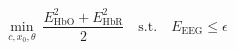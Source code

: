 \documentclass{article}
\begin{document}
\fontsize{22}{29}\selectfont
\[
\min_{c,x_0,\theta}\ \frac{E_{\mathrm{HbO}}^2+E_{\mathrm{HbR}}^2}{2}\quad\mathrm{s.t.}\quad E_{\mathrm{EEG}}\le\epsilon
\]
\end{document}
